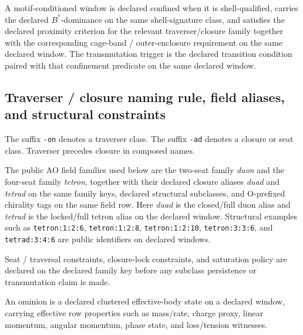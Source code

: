 \begin{definition}
\label{def:confinement-predicate}
A motif-conditioned window is declared confined when it is shell-qualified, carries the declared $B^*$-dominance on the same shell-signature class, and satisfies the declared proximity criterion for the relevant traverser/closure family together with the corresponding cage-band / outer-enclosure requirement on the same declared window. The transmutation trigger is the declared transition condition paired with that confinement predicate on the same declared window.
\end{definition}

\subsection{Traverser / closure naming rule, field aliases, and structural constraints}
\begin{definition}
\label{def:traverser-closure-rule}
The suffix \texttt{-on} denotes a traverser class. The suffix \texttt{-ad} denotes a closure or seat class. Traverser precedes closure in composed names.
\end{definition}

\begin{definition}
\label{def:field-families}
The public AO field families used below are the two-seat family \emph{duon} and the four-seat family \emph{tetron}, together with their declared closure aliases \emph{duad} and \emph{tetrad} on the same family keys, declared structural subclasses, and O-prefixed chirality tags on the same field row. Here \emph{duad} is the closed/full duon alias and \emph{tetrad} is the locked/full tetron alias on the declared window. Structural examples such as \texttt{tetron:1:2:6}, \texttt{tetron:1:2:8}, \texttt{tetron:1:2:10}, \texttt{tetron:3:3:6}, and \texttt{tetrad:3:4:6} are public identifiers on declared windows.
\end{definition}

\begin{definition}
\label{def:structural-constraints}
Seat / traversal constraints, closure-lock constraints, and saturation policy are declared on the declared family key before any subclass persistence or transmutation claim is made.
\end{definition}

\begin{definition}[Ominion]
\label{def:ominion}
An ominion is a declared clustered effective-body state on a declared window, carrying effective row properties such as mass/rate, charge proxy, linear momentum, angular momentum, phase state, and loss/tension witnesses.
\end{definition}

